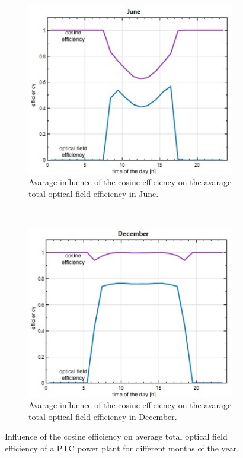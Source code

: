 \begin{figure}[!htbp]
        \centering                
        \begin{subfigure}[b]{0.5\textwidth}
                \centering
                \includegraphics[width=1\textwidth]{FIG/PTC_field_eff_winter}
                \caption{Avarage influence of the cosine efficiency on the avarage total optical field efficiency in June.}\label{PTC_field_eff_winter}
        \end{subfigure}%
        ~
        \begin{subfigure}[b]{0.5\textwidth}
                \centering
                \includegraphics[width=1\textwidth]{FIG/PTC_field_eff_summer}
                \caption{Avarage influence of the cosine efficiency on the avarage total optical field efficiency in December.}\label{PTC_field_eff_summer}
        \end{subfigure}
        \caption[Influence of the cosine efficiency on average total optical field efficiency of a PTC power plant for different months of the year.]{Influence of the cosine efficiency on average total optical field efficiency of a PTC power plant for different months of the year.}\label{PTC_field_eff}
\end{figure}
